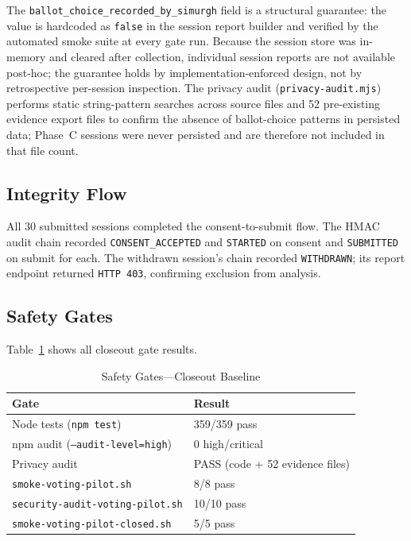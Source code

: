 \documentclass[conference]{IEEEtran}
\begin{document}
The \texttt{ballot\_choice\_recorded\_by\_simurgh} field is a structural
guarantee: the value is hardcoded as \texttt{false} in the session report
builder and verified by the automated smoke suite at every gate run. Because the
session store was in-memory and cleared after collection, individual session
reports are not available post-hoc; the guarantee holds by implementation-enforced
design, not by retrospective per-session inspection. The privacy audit
(\texttt{privacy-audit.mjs}) performs static string-pattern searches across
source files and 52 pre-existing evidence export files to confirm the absence of
ballot-choice patterns in persisted data; Phase~C sessions were never persisted
and are therefore not included in that file count.

\subsection{Integrity Flow}

All 30 submitted sessions completed the consent-to-submit flow. The HMAC audit
chain recorded \texttt{CONSENT\_ACCEPTED} and \texttt{STARTED} on consent and
\texttt{SUBMITTED} on submit for each. The withdrawn session's chain recorded
\texttt{WITHDRAWN}; its report endpoint returned \texttt{HTTP~403}, confirming
exclusion from analysis.

\subsection{Safety Gates}

Table~\ref{tab:gates} shows all closeout gate results.

\begin{table}[!t]
  \caption{Safety Gates---Closeout Baseline}
  \centering
  \begin{tabular}{ll}
    \toprule
    Gate & Result \\
    \midrule
    Node tests (\texttt{npm test}) & 359/359 pass \\
    npm audit (\texttt{--audit-level=high}) & 0 high/critical \\
    Privacy audit & PASS (code + 52 evidence files) \\
    \texttt{smoke-voting-pilot.sh} & 8/8 pass \\
    \texttt{security-audit-voting-pilot.sh} & 10/10 pass \\
    \texttt{smoke-voting-pilot-closed.sh} & 5/5 pass \\
    \bottomrule
  \end{tabular}
  \label{tab:gates}
\end{table}
\end{document}
